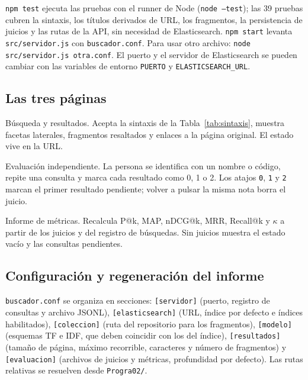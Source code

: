 \documentclass[11pt,spanish]{article}
\begin{document}
\texttt{npm test} ejecuta las pruebas con el runner de Node
(\texttt{node --test}); las 39 pruebas cubren la sintaxis, los títulos
derivados de URL, los fragmentos, la persistencia de juicios y las rutas de la
API, sin necesidad de Elasticsearch. \texttt{npm start} levanta
\texttt{src/servidor.js} con \texttt{buscador.conf}. Para usar otro archivo:
\texttt{node src/servidor.js otra.conf}. El puerto y el servidor de
Elasticsearch se pueden cambiar con las variables de entorno \texttt{PUERTO} y
\texttt{ELASTICSEARCH\_URL}.

\subsection{Las tres páginas}
\label{sec:tres-paginas}

\begin{description}[leftmargin=1.4em,itemsep=3pt]
  \item[\texttt{/}] Búsqueda y resultados. Acepta la sintaxis de la
    Tabla~\ref{tab:sintaxis}, muestra facetas laterales, fragmentos resaltados y
    enlaces a la página original. El estado vive en la URL.
  \item[\texttt{/evaluar}] Evaluación independiente. La persona se identifica
    con un nombre o código, repite una consulta y marca cada resultado como 0,
    1 o 2. Los atajos \texttt{0}, \texttt{1} y \texttt{2} marcan el primer
    resultado pendiente; volver a pulsar la misma nota borra el juicio.
  \item[\texttt{/metricas}] Informe de métricas. Recalcula P@k, MAP, nDCG@k,
    MRR, Recall@k y $\kappa$ a partir de los juicios y del registro de
    búsquedas. Sin juicios muestra el estado vacío y las consultas pendientes.
\end{description}

\subsection{Configuración y regeneración del informe}
\label{sec:configuracion}

\texttt{buscador.conf} se organiza en secciones: \texttt{[servidor]} (puerto,
registro de consultas y archivo JSONL), \texttt{[elasticsearch]} (URL, índice
por defecto e índices habilitados), \texttt{[coleccion]} (ruta del repositorio
para los fragmentos), \texttt{[modelo]} (esquemas TF e IDF, que deben coincidir
con los del índice), \texttt{[resultados]} (tamaño de página, máximo
recorrible, caracteres y número de fragmentos) y \texttt{[evaluacion]}
(archivos de juicios y métricas, profundidad por defecto). Las rutas relativas
se resuelven desde \texttt{Progra02/}.
\end{document}
